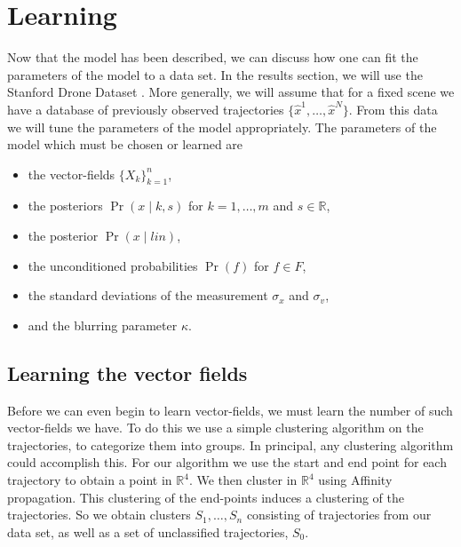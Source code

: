 \documentclass[conference]{IEEEtran}
\begin{document}
\section{Learning} \label{sec:learning}


  Now that the model has been described, we can discuss how one can fit the parameters of the model to a data set.
  In the results section, we will use the Stanford Drone Dataset \cite{StanfordDroneData}.
  More generally, we will assume that for a fixed scene we have a database of previously observed trajectories $\{ \hat{x}^1, \dots, \hat{x}^N\}$.
  From this data we will tune the parameters of the model appropriately.
  The parameters of the model which must be chosen or learned are
  \begin{itemize}
  	\item the vector-fields $\{ X_k\}_{k=1}^{n}$,
	\item the posteriors $\Pr(x \mid k,s)$ for $k=1,\dots,m$ and $s \in \mathbb{R}$,
	\item the posterior $\Pr(x \mid lin)$,
	\item the unconditioned probabilities $\Pr(f)$ for $f \in F$,
	\item the standard deviations of the measurement $\sigma_x$ and $\sigma_v$,
	\item and the blurring parameter $\kappa$.
  \end{itemize}
  
  \subsection{Learning the vector fields}
  Before we can even begin to learn vector-fields, we must learn the number of such vector-fields we have.
  To do this we use a simple clustering algorithm on the trajectories, to categorize them into groups.
  In principal, any clustering algorithm could accomplish this.
  For our algorithm we use the start and end point for each trajectory to obtain a point in $\mathbb{R}^4$.
  We then cluster in $\mathbb{R}^4$ using Affinity propagation.
  This clustering of the end-points induces a clustering of the trajectories.
  So we obtain clusters $S_1, \dots, S_n$ consisting of trajectories from our data set, as well as a set of unclassified trajectories, $S_0$.
  
\end{document}
